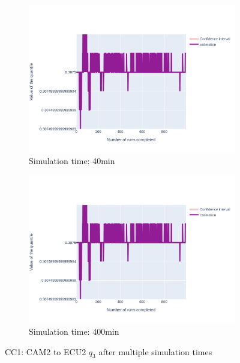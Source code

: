 \documentclass{article}
\begin{document}
\begin{figure}[H]
\begin{subfigure}{.495\textwidth}
        \vspace{.5cm}
    \end{subfigure}
    \begin{subfigure}{.495\textwidth}
        \centering
        \includegraphics[width=\textwidth]{../fig/quantile3/CC1: CAM2 --> ECU2_40mn.png}
        \caption{Simulation time: 40min}
    \end{subfigure}
    \begin{subfigure}{.495\textwidth}
        \centering
        \includegraphics[width=\textwidth]{../fig/quantile3/CC1: CAM2 --> ECU2_400mn.png}
        \caption{Simulation time: 400min}
    \end{subfigure}
    \caption{CC1: CAM2 to ECU2 $q_3$ after multiple simulation times}
\end{figure}
\end{document}
